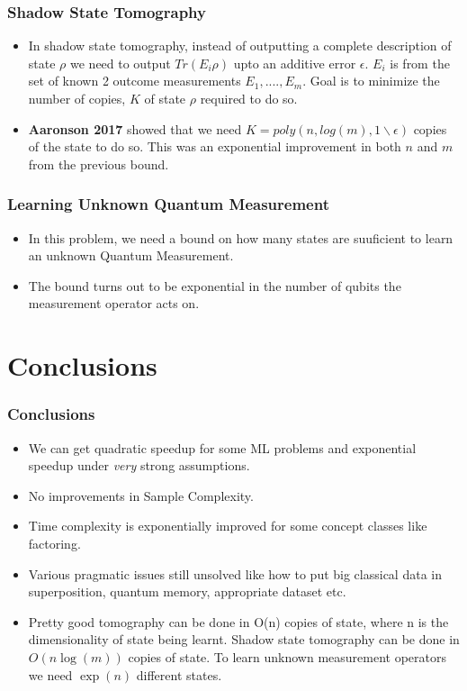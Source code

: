 \documentclass{beamer}
\begin{document}
    
    \begin{frame}
    \frametitle{Shadow State Tomography}
    
        \begin{itemize}
    
        \item In shadow state tomography, instead of outputting a complete description of state $\rho$ we need to output $Tr(E_i\rho)$ upto an additive error $\epsilon$. $E_i$ is from the set of known 2 outcome measurements ${E_1,....,E_m}$. Goal is to minimize the number of copies, $K$ of state $\rho$ required to do so. 
    
        \item \textbf{Aaronson 2017} showed that we need $K = {poly}(n, log(m), 1\backslash\epsilon)$ copies of the state to do so. This was an exponential improvement in both $n$ and $m$ from the previous bound.
    
        \end{itemize}
    \end{frame}
    
    \begin{frame}
    \frametitle{Learning Unknown Quantum Measurement}
    
        \begin{itemize}
    
        \item In this problem, we need a bound on how many states are suuficient to learn an unknown Quantum Measurement.
    
        \item The bound turns out to be exponential in the number of qubits the measurement operator acts on.
        \end{itemize}
    \end{frame}
\section{Conclusions}
\begin{frame}
\frametitle{Conclusions}
    \begin{itemize}
        \item We can get quadratic speedup for some ML problems
        and exponential speedup under \textit{very} strong assumptions.

        \item No improvements in Sample Complexity.
        \item Time complexity is exponentially improved for
        some concept classes like factoring.

        \item Various pragmatic issues still unsolved like how to put big 
        classical data in superposition, quantum memory, appropriate dataset etc.

        \item Pretty good tomography can be done in O(n) copies of state, where n is the dimensionality of state being learnt.
        Shadow state tomography can be done in $O(n \log(m))$ copies of state. To learn unknown measurement operators we need $\exp(n)$ different states. 

    \end{itemize}
\end{frame}
\end{document}
